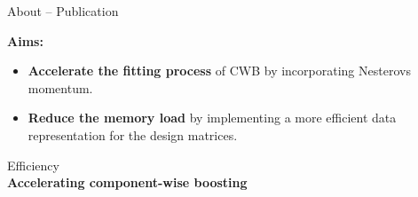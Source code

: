 \documentclass[t,10pt]{beamer}
\newcommand{\fSlide}[2]{
\begin{frame}[plain]{}%
  \vspace{4cm}%
  \Large #1\\[0.2cm]%
  {\LARGE\textbf{#2}}%
	\addtocounter{framenumber}{-1}%
\end{frame}%
}
\begin{document}
\begin{frame}{About -- Publication}

  \vspace{-0.2cm}
  \begin{figure}
    \centering
  \end{figure}
  \vspace{-0.4cm}

  \textbf{Aims:}
  \begin{itemize}
    \item
      \textbf{Accelerate the fitting process} of CWB by incorporating Nesterovs momentum.
    \item
      \textbf{Reduce the memory load} by implementing a more efficient data representation for the design matrices.
  \end{itemize}

\end{frame}

\fSlide{Efficiency}{Accelerating component-wise boosting}
\end{document}
